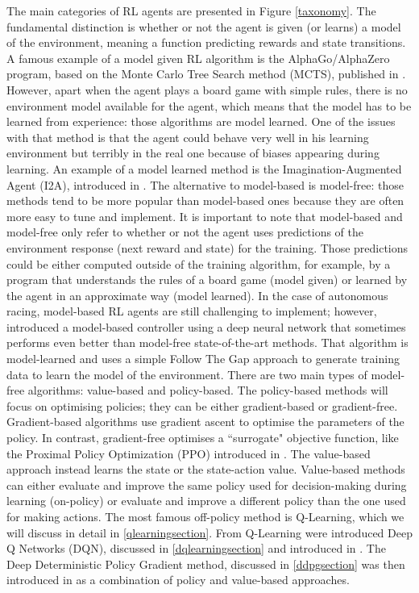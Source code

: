 The main categories of RL agents are presented in Figure \ref{taxonomy}. The fundamental distinction is whether or not the agent is given (or learns) a model of the environment, meaning a function predicting rewards and state transitions. A famous example of a model given RL algorithm is the AlphaGo/AlphaZero program, based on the Monte Carlo Tree Search method (MCTS), published in \cite{Silver2016MasteringTG}. However, apart when the agent plays a board game with simple rules, there is no environment model available for the agent, which means that the model has to be learned from experience: those algorithms are model learned. One of the issues with that method is that the agent could behave very well in his learning environment but terribly in the real one because of biases appearing during learning. An example of a model learned method is the Imagination-Augmented Agent (I2A), introduced in \cite{I2A}. \newline
The alternative to model-based is model-free: those methods tend to be more popular than model-based ones because they are often more easy to tune and implement. \newline
It is important to note that model-based and model-free only refer to whether or not the agent uses predictions of the environment response (next reward and state) for the training. Those predictions could be either computed outside of the training algorithm, for example, by a program that understands the rules of a board game (model given) or learned by the agent in an approximate way (model learned). In the case of autonomous racing, model-based RL agents are still challenging to implement; however, \cite{modelbased} introduced a model-based controller using a deep neural network that sometimes performs even better than model-free state-of-the-art methods. That algorithm is model-learned and uses a simple Follow The Gap approach to generate training data to learn the model of the environment. \newline
 There are two main types of model-free algorithms: value-based and policy-based. The policy-based methods will focus on optimising policies; they can be either gradient-based or gradient-free. Gradient-based algorithms use gradient ascent to optimise the parameters of the policy. In contrast, gradient-free optimises a ``surrogate" objective function, like the Proximal Policy Optimization (PPO) introduced in \cite{ppo}. The value-based approach instead learns the state or the state-action value. Value-based methods can either evaluate and improve the same policy used for decision-making during learning (on-policy) or evaluate and improve a different policy than the one used for making actions. The most famous off-policy method is Q-Learning, which we will discuss in detail in \ref{qlearningsection}. From Q-Learning were introduced Deep Q Networks (DQN), discussed in \ref{dqlearningsection} and introduced in \cite{drl}. The Deep Deterministic Policy Gradient method, discussed in \ref{ddpgsection} was then introduced in \cite{ddpg2015} as a combination of policy and value-based approaches.


